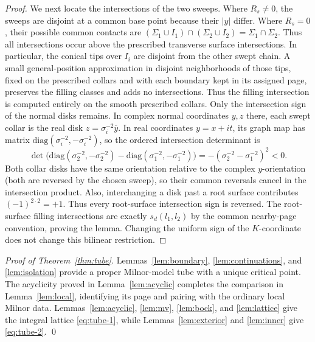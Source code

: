\begin{proof}
We next locate the intersections of the two sweeps.
Where \(R_s\ne0\), the sweeps are
disjoint at a common base point because their \(|y|\) differ.
Where \(R_s=0\), their possible common contacts are
\((\Sigma_1\cup I_1)\cap(\Sigma_2\cup I_2)
=\Sigma_1\cap\Sigma_2\). Thus all intersections occur
above the prescribed transverse surface intersections.
In particular, the conical tips over \(I_i\) are disjoint from
the other swept chain. A small general-position approximation in
disjoint neighborhoods of those tips, fixed on the prescribed
collars and with each boundary kept in its assigned page, preserves
the filling classes and adds no intersections. Thus the filling
intersection is computed entirely on the smooth prescribed collars.
Only the intersection sign of the normal disks remains.
In complex normal coordinates \(y,z\)
there, each swept collar is the real
disk \(z=\sigma_i^{-2}\overline y\).
In real coordinates \(y=x+it\), its
graph map has matrix
\(\mathrm{diag}(\sigma_i^{-2},
-\sigma_i^{-2})\), so the ordered
intersection determinant is
\[
\det\bigl(
\mathrm{diag}(\sigma_2^{-2},-\sigma_2^{-2})
-\mathrm{diag}(\sigma_1^{-2},-\sigma_1^{-2})
\bigr)
=-(\sigma_2^{-2}-\sigma_1^{-2})^2<0.
\]
Both collar disks have the same orientation relative to
the complex \(y\)-orientation (both are reversed by the
chosen sweep), so their common reversals cancel in the
intersection product. Also,
interchanging a disk past a root
surface contributes
\((-1)^{2\cdot2}=+1\).
Thus every root-surface
intersection sign is reversed.
The root-surface filling
intersections are exactly
\(s_d(l_1,l_2)\) by the common
nearby-page convention, proving
the lemma. Changing the
uniform sign of the \(K\)-coordinate
does not change this bilinear
restriction.
\end{proof}

\noindent\emph{Proof of Theorem~\ref{thm:tube}.}
Lemmas~\ref{lem:boundary}, \ref{lem:continuations}, and
\ref{lem:isolation} provide a
proper Milnor-model tube with
a unique critical point. The acyclicity
proved in Lemma~\ref{lem:acyclic} completes
the comparison in Lemma~\ref{lem:local},
identifying its page and pairing with the
ordinary local Milnor data.
Lemmas~\ref{lem:acyclic},
\ref{lem:mv}, \ref{lem:bock},
and \ref{lem:lattice} give the
integral lattice \eqref{eq:tube-1}, while
Lemmas~\ref{lem:exterior} and
\ref{lem:inner} give \eqref{eq:tube-2}.
\qed
